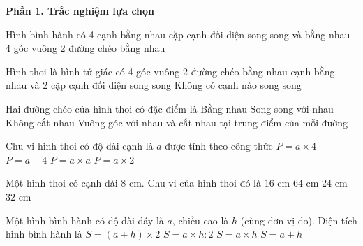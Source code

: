 \textbf{Phần 1. Trắc nghiệm lựa chọn}

\begin{ex} %
Hình bình hành có
\choice
{4 cạnh bằng nhau}
{ cặp cạnh đối diện song song và bằng nhau}
{4 góc vuông}
{2 đường chéo bằng nhau}
\end{ex}

\begin{ex} %
Hình thoi là hình tứ giác có
\choice
{4 góc vuông}
{2 đường chéo bằng nhau}
{ cạnh bằng nhau và 2 cặp cạnh đối diện song song}
{Không có cạnh nào song song}
\end{ex}

\begin{ex} %
Hai đường chéo của hình thoi có đặc điểm là
\choice
{Bằng nhau}
{Song song với nhau}
{Không cắt nhau}
{\True Vuông góc với nhau và cắt nhau tại trung điểm của mỗi đường}
\end{ex}

\begin{ex} %
Chu vi hình thoi có độ dài cạnh là $a$ được tính theo công thức
\choice
{\True $P = a \times 4$}
{$P = a + 4$}
{$P = a \times a$}
{$P = a \times 2$}
\end{ex}

\begin{ex} %
Một hình thoi có cạnh dài $8\text{ cm}$. Chu vi của hình thoi đó là
\choice
{$16\text{ cm}$}
{$64\text{ cm}$}
{$24\text{ cm}$}
{\True $32\text{ cm}$}
\end{ex}

\begin{ex} %
Một hình bình hành có độ dài đáy là $a$, chiều cao là $h$ (cùng đơn vị đo). Diện tích hình bình hành là
\choice
{$S = (a + h) \times 2$}
{$S = a \times h : 2$}
{\True $S = a \times h$}
{$S = a + h$}
\end{ex}

